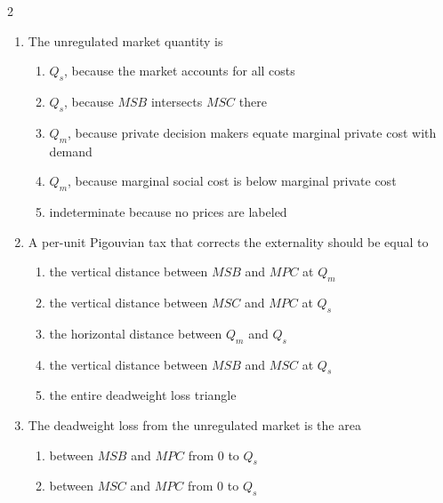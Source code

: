 \documentclass[10pt]{article}
\newenvironment{choiceslist}
  {\begin{enumerate}[label=(\Alph*), leftmargin=1.55em, itemsep=0.1em, topsep=0.15em, parsep=0pt]}
  {\end{enumerate}}
\newenvironment{stimulus}
  {\begin{center}\begin{minipage}{0.97\columnwidth}\footnotesize\itshape\setlength{\tabcolsep}{3pt}\renewcommand{\arraystretch}{0.96}}
  {\end{minipage}\end{center}}
\begin{document}
\begin{multicols*}{2}
\begin{stimulus}
\begin{center}
\end{center}
\end{stimulus}
\begin{enumerate}[resume*=curveq, leftmargin=*, itemsep=0.8em, topsep=0.18em, parsep=0pt]
\item The unregulated market quantity is
\begin{choiceslist}
\item $Q_s$, because the market accounts for all costs
\item $Q_s$, because $MSB$ intersects $MSC$ there
\item $Q_m$, because private decision makers equate marginal private cost with demand
\item $Q_m$, because marginal social cost is below marginal private cost
\item indeterminate because no prices are labeled
\end{choiceslist}
\item A per-unit Pigouvian tax that corrects the externality should be equal to
\begin{choiceslist}
\item the vertical distance between $MSB$ and $MPC$ at $Q_m$
\item the vertical distance between $MSC$ and $MPC$ at $Q_s$
\item the horizontal distance between $Q_m$ and $Q_s$
\item the vertical distance between $MSB$ and $MSC$ at $Q_s$
\item the entire deadweight loss triangle
\end{choiceslist}
\item The deadweight loss from the unregulated market is the area
\begin{choiceslist}
\item between $MSB$ and $MPC$ from 0 to $Q_s$
\item between $MSC$ and $MPC$ from 0 to $Q_s$

\end{choiceslist}
\end{enumerate}
\end{multicols*}
\end{document}

